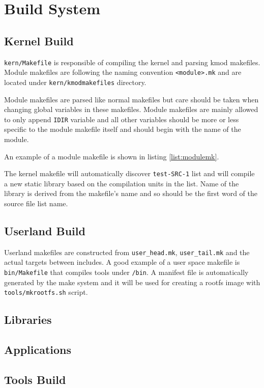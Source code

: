 \part{Build System}

\chapter{Kernel Build}

\verb+kern/Makefile+ is responsible of compiling the kernel and parsing kmod
makefiles. Module makefiles are following the naming convention
\verb+<module>.mk+ and are located under \verb+kern/kmodmakefiles+ directory.

Module makefiles are parsed like normal makefiles but care should be taken when
changing global variables in these makefiles. Module makefiles are mainly
allowed to only append \verb+IDIR+ variable and all other variables should be
more or less specific to the module makefile itself and should begin with the
name of the module.

An example of a module makefile is shown in listing \ref{list:modulemk}.



The kernel makefile will automatically discover \verb+test-SRC-1+ list and will
compile a new static library based on the compilation units in the list. Name of
the library is derived from the makefile's name and so should be the first word
of the source file list name.


\chapter{Userland Build}

Userland makefiles are constructed from \verb+user_head.mk+,
\verb+user_tail.mk+ and the actual targets between includes. A good example of
a user space makefile is \verb+bin/Makefile+ that compiles tools under
\verb+/bin+. A manifest file is automatically generated by the make system and
it will be used for creating a rootfs image with \verb+tools/mkrootfs.sh+
script.

\chapter{Libraries}
\chapter{Applications}
\chapter{Tools Build}
